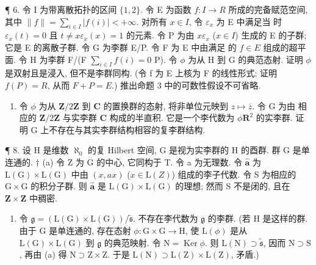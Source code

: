 ¶ 6. 令 I 为带离散拓扑的区间 \(\{1,2\}\). 令 E 为函数 \(f: I \to R\) 所成的完备赋范空间, 其中 \(\|f\| = \sum_{i \in I} |f(i)| < +\infty\). 对所有 \(x \in I\), 令 \(\varepsilon_x\) 为 E 中满足当  时 \(\varepsilon_x(t) = 0\) 且 \(t \neq x\)\(\varepsilon_x(x) = 1\) 的元素. 令 P 为由 \(x\varepsilon_x\) (\(x \in I\)) 生成的 E 的子群; 它是 E 的离散子群. 令 G 为李群 E/P. 令 F 为 E 中由满足  的 \(f \in E\) 组成的超平面. 令 H 为李群 F/(F \(\sum_{i \in I} f(i) = 0\) P). 令 \(\phi\) 为从 H 到 G 的典范态射. 证明 \(\phi\) 是双射且是浸入, 但不是李群同构. (令 f 为 E 上核为 F 的线性形式; 证明 \(f(P) = R\), 从而 \(F + P = E\).) 推出命题 3 中的可数性假设不可省略.

\begin{enumerate}
\def\labelenumi{\arabic{enumi}.}
\setcounter{enumi}{6}
\tightlist
\item
  令 \(\phi\) 为从 \(\mathbf{Z} / 2\mathbf{Z}\) 到 \(\mathbf{C}\) 的置换群的态射, 将非单位元映到 \(z\mapsto \overline{z}\). 令 \(\mathrm{G}\) 为由  相应的 \(\mathbf{Z} / 2\mathbf{Z}\) 与实李群 \(\mathbf{C}\) 构成的半直积. 它是一个李代数为 \(\phi\)\(\mathbf{R}^2\) 的实李群. 证明 \(\mathrm{G}\) 上不存在与其实李群结构相容的复李群结构.
\end{enumerate}

¶ 8. 设 H 是维数 \(\aleph_{0}\) 的复 Hilbert 空间, G 是视为实李群的 H 的酉群. 群 G 是单连通的. \(\dagger\) (a) 令 Z 为 G 的中心, 它同构于 T. 令 a 为无理数. 令 \(\hat{\mathbf{a}}\) 为 \(\mathrm{L}(\mathrm{G})\times \mathrm{L}(\mathrm{G})\) 中由 \((x,ax)\) (\(x\in \mathrm{L}(Z)\)) 组成的李子代数. 令 S 为相应的 \(\mathrm{G}\times \mathrm{G}\) 的积分子群. 则 \(\hat{\mathbf{a}}\) 是 \(\mathrm{L}(\mathrm{G})\times \mathrm{L}(\mathrm{G})\) 的理想; 然而 S 不是闭的, 且在 \(\mathbf{Z}\times \mathbf{Z}\) 中稠密.

\begin{enumerate}
\def\labelenumi{(\alph{enumi})}
\setcounter{enumi}{1}
\tightlist
\item
  令 \(\mathfrak{g} = (\mathrm{L}(\mathrm{G})\times \mathrm{L}(\mathrm{G})) / \tilde{\mathfrak{s}}\). 不存在李代数为 \(\mathfrak{g}\) 的李群. (若 \(\mathrm{H}\) 是这样的群. 由于 \(\mathrm{G}\) 是单连通的, 存在态射 \(\phi : \mathrm{G}\times \mathrm{G}\to \mathrm{H}\), 使 \(\mathrm{L}(\phi)\) 是从 \(\mathrm{L}(\mathrm{G})\times \mathrm{L}(\mathrm{G})\) 到 \(\mathfrak{g}\) 的典范映射. 令 \(\mathrm{N} = \operatorname{Ker}\phi\). 则 \(\mathrm{L}(\mathrm{N})\supset \tilde{\mathfrak{s}}\), 因而 \(\mathrm{N}\supset \mathrm{S}\), 再由 (a) 得 \(\mathrm{N}\supset \mathrm{Z}\times \mathrm{Z}\). 于是 \(\mathrm{L}(\mathrm{N})\supset \mathrm{L}(\mathrm{Z})\times \mathrm{L}(\mathrm{Z})\), 矛盾.)
\end{enumerate}

